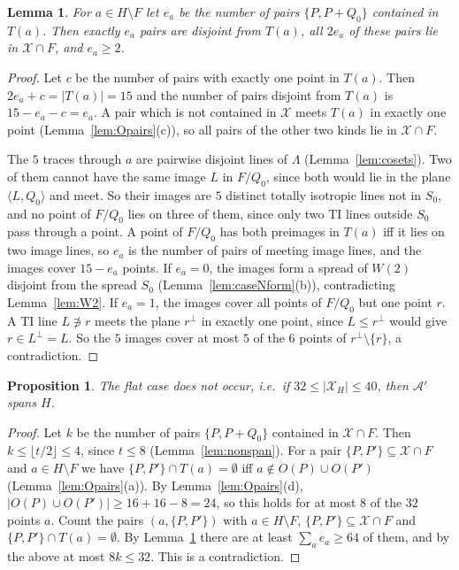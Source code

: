 \documentclass[11pt]{amsart}
\newtheorem{lemma}[theorem]{Lemma}
\newtheorem{proposition}[theorem]{Proposition}
\theoremstyle{definition}
\newcommand{\X}{\mathcal{X}}
\newcommand{\A}{\mathcal{A}}
\begin{document}
\begin{lemma}\label{lem:ea}
For $a\in H\setminus F$ let $e_a$ be the number of pairs $\{P,P+Q_0\}$ contained in $T(a)$. Then exactly $e_a$ pairs are disjoint from $T(a)$, all $2e_a$ of these pairs lie in $\X\cap F$, and $e_a\ge2$.
\end{lemma}
\begin{proof}
Let $c$ be the number of pairs with exactly one point in $T(a)$. Then $2e_a+c=|T(a)|=15$ and the number of pairs disjoint from $T(a)$ is $15-e_a-c=e_a$. A pair which is not contained in $\X$ meets $T(a)$ in exactly one point (Lemma~\ref{lem:Opairs}(c)), so all pairs of the other two kinds lie in $\X\cap F$.

The $5$ traces through $a$ are pairwise disjoint lines of $\Lambda$ (Lemma~\ref{lem:cosets}). Two of them cannot have the same image $L$ in $F/Q_0$, since both would lie in the plane $\langle L,Q_0\rangle$ and meet. So their images are $5$ distinct totally isotropic lines not in $S_0$, and no point of $F/Q_0$ lies on three of them, since only two TI lines outside $S_0$ pass through a point. A point of $F/Q_0$ has both preimages in $T(a)$ iff it lies on two image lines, so $e_a$ is the number of pairs of meeting image lines, and the images cover $15-e_a$ points. If $e_a=0$, the images form a spread of $W(2)$ disjoint from the spread $S_0$ (Lemma~\ref{lem:caseNform}(b)), contradicting Lemma~\ref{lem:W2}. If $e_a=1$, the images cover all points of $F/Q_0$ but one point $r$. A TI line $L\not\ni r$ meets the plane $r^\perp$ in exactly one point, since $L\le r^\perp$ would give $r\in L^\perp=L$. So the $5$ images cover at most $5$ of the $6$ points of $r^\perp\setminus\{r\}$, a contradiction.
\end{proof}

\begin{proposition}\label{prop:caseN}
The flat case does not occur, i.e.\ if $32\le|\X_H|\le40$, then $\A'$ spans $H$.
\end{proposition}
\begin{proof}
Let $k$ be the number of pairs $\{P,P+Q_0\}$ contained in $\X\cap F$. Then $k\le\lfloor t/2\rfloor\le4$, since $t\le8$ (Lemma~\ref{lem:nonspan}). For a pair $\{P,P'\}\subseteq\X\cap F$ and $a\in H\setminus F$ we have $\{P,P'\}\cap T(a)=\emptyset$ iff $a\notin O(P)\cup O(P')$ (Lemma~\ref{lem:Opairs}(a)). By Lemma~\ref{lem:Opairs}(d), $|O(P)\cup O(P')|\ge16+16-8=24$, so this holds for at most $8$ of the $32$ points $a$. Count the pairs $(a,\{P,P'\})$ with $a\in H\setminus F$, $\{P,P'\}\subseteq\X\cap F$ and $\{P,P'\}\cap T(a)=\emptyset$. By Lemma~\ref{lem:ea} there are at least $\sum_ae_a\ge64$ of them, and by the above at most $8k\le32$. This is a contradiction.
\end{proof}
\end{document}
